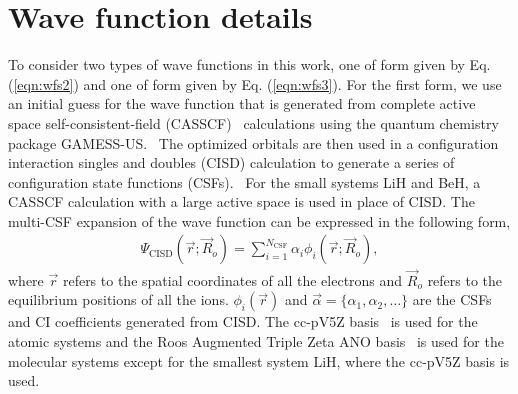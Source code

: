 \documentclass[aip,jcp,numerical,reprint]{revtex4-1}
\begin{document}

\section{ Wave function details}
To consider two types of wave functions in this work, one of form given by Eq.(\ref{eqn:wfs2}) and one of form given by  Eq. (\ref{eqn:wfs3}).  For the first form, we use an initial guess for the wave function that is generated from complete active space self-consistent-field (CASSCF)~\cite{Chaban_MCSCF,Szabo} calculations using the quantum chemistry package GAMESS-US.~\cite{GAMESS} The optimized orbitals are then used in a configuration interaction singles and doubles (CISD) calculation to generate a series of configuration state functions (CSFs).~\cite{Pauncz_CSF} For the small systems LiH and BeH, a CASSCF calculation with a large active space is used in place of CISD. The multi-CSF expansion of the wave function can be expressed in the following form,
\begin{align}
\Psi_{\text{CISD}}(\vec{r};\vec{R}_o)=\sum\limits_{i=1}^{N_{\text{CSF}}}\alpha_i\phi_i(\vec{r};\vec{R}_o), \label{eq:psi_gms}
\end{align}
where $\vec{r}$ refers to the spatial coordinates of all the electrons and $\vec{R}_o$ refers to the equilibrium positions of all the ions. $\phi_i(\vec{r})$ and $\vec{\alpha}=\{\alpha_1,\alpha_2,\dots\}$ are the CSFs and CI coefficients generated from CISD. The cc-pV5Z basis~\cite{dunning} is used for the atomic systems and the Roos Augmented Triple Zeta ANO basis~\cite{roos} is used for the molecular systems except for the smallest system LiH, where the cc-pV5Z basis is used.
\end{document}
